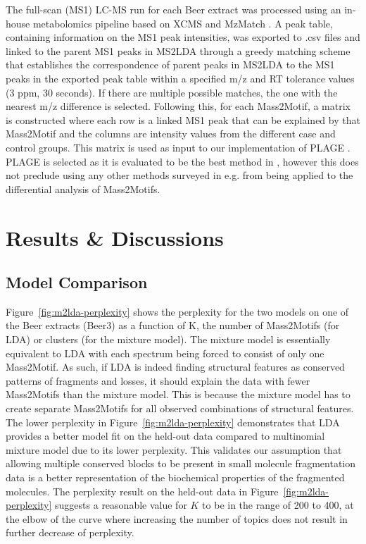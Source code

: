 The full-scan (MS1) LC-MS run for each Beer extract was processed using an in-house metabolomics pipeline based on XCMS \cite{Smith2006} and MzMatch \cite{Scheltema2011}. A peak table, containing information on the MS1 peak intensities, was exported to .csv files and linked to the parent MS1 peaks in MS2LDA through a greedy matching scheme that establishes the correspondence of parent peaks in MS2LDA to the MS1 peaks in the exported peak table within a specified m/z and RT tolerance values (3 ppm, 30 seconds). If there are multiple possible matches, the one with the nearest m/z difference is selected. Following this, for each Mass2Motif, a matrix is constructed where each row is a linked MS1 peak that can be explained by that Mass2Motif and the columns are intensity values from the different case and control groups. This matrix is used as input to our implementation of PLAGE \cite{tomfohr2005pathway}. PLAGE is selected as it is evaluated to be the best method in \cite{tarca2013comparison}, however this does not preclude using any other methods surveyed in e.g. \cite{tarca2013comparison} from being applied to the differential analysis of Mass2Motifs.

\section{Results \& Discussions}

\subsection{Model Comparison\label{sub:lda-model-comparison}}

Figure~\ref{fig:m2lda-perplexity} shows the perplexity for the two models on one of the Beer extracts (Beer3) as a function of K, the number of Mass2Motifs (for LDA) or clusters (for the mixture model). The mixture model is essentially equivalent to LDA with each spectrum being forced to consist of only one Mass2Motif. As such, if LDA is indeed finding structural features as conserved patterns of fragments and losses, it should explain the data with fewer Mass2Motifs than the mixture model. This is because the mixture model has to create separate Mass2Motifs for all observed combinations of structural features. The lower perplexity in Figure~\ref{fig:m2lda-perplexity} demonstrates that LDA provides a better model fit on the held-out data compared to multinomial mixture model due to its lower perplexity. This validates our assumption that allowing multiple conserved blocks to be present in small molecule fragmentation data is a better representation of the biochemical properties of the fragmented molecules. The perplexity result on the held-out data in Figure~\ref{fig:m2lda-perplexity} suggests a reasonable value for $K$ to be in the range of 200 to 400, at the elbow of the curve where increasing the number of topics does not result in further decrease of perplexity. 

